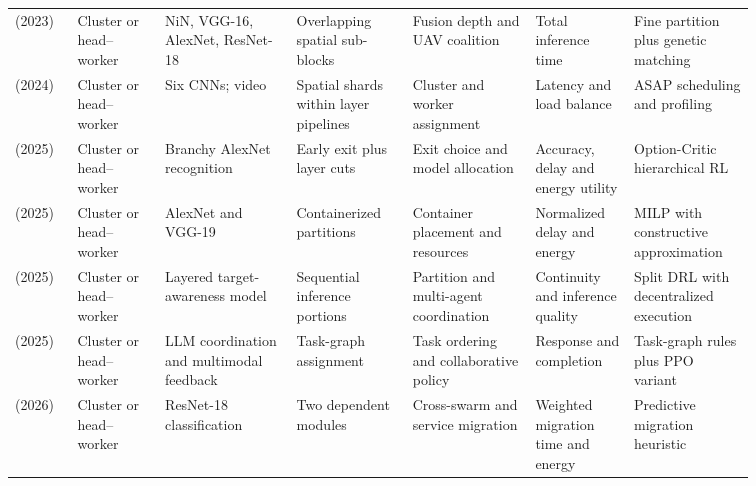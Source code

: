 \begin{table}[!tp]
\begin{tabular}{@{}Y{0.0705\linewidth}Y{0.1043\linewidth}Y{0.1589\linewidth}Y{0.1363\linewidth}Y{0.1419\linewidth}Y{0.1175\linewidth}Y{0.1307\linewidth}@{}}
\cite{R0043}\newline\mbox{(2023)} & Cluster or head--worker & NiN, VGG-16, AlexNet, ResNet-18 & Overlapping spatial sub-blocks & Fusion depth and UAV coalition & Total inference time & Fine partition plus genetic matching \\
\cite{R0014}\newline\mbox{(2024)} & Cluster or head--worker & Six CNNs; video & Spatial shards within layer pipelines & Cluster and worker assignment & Latency and load balance & ASAP scheduling and profiling \\
\cite{R0022}\newline\mbox{(2025)} & Cluster or head--worker & Branchy AlexNet recognition & Early exit plus layer cuts & Exit choice and model allocation & Accuracy, delay and energy utility & Option-Critic hierarchical RL \\
\cite{R0083}\newline\mbox{(2025)} & Cluster or head--worker & AlexNet and VGG-19 & Containerized partitions & Container placement and resources & Normalized delay and energy & MILP with constructive approximation \\
\cite{R0106}\newline\mbox{(2025)} & Cluster or head--worker & Layered target-awareness model & Sequential inference portions & Partition and multi-agent coordination & Continuity and inference quality & Split DRL with decentralized execution \\
\cite{R0223}\newline\mbox{(2025)} & Cluster or head--worker & LLM coordination and multimodal feedback & Task-graph assignment & Task ordering and collaborative policy & Response and completion & Task-graph rules plus PPO variant \\
\cite{R0002}\newline\mbox{(2026)} & Cluster or head--worker & ResNet-18 classification & Two dependent modules & Cross-swarm and service migration & Weighted migration time and energy & Predictive migration heuristic \\
\bottomrule
\end{tabular}
\end{table}

